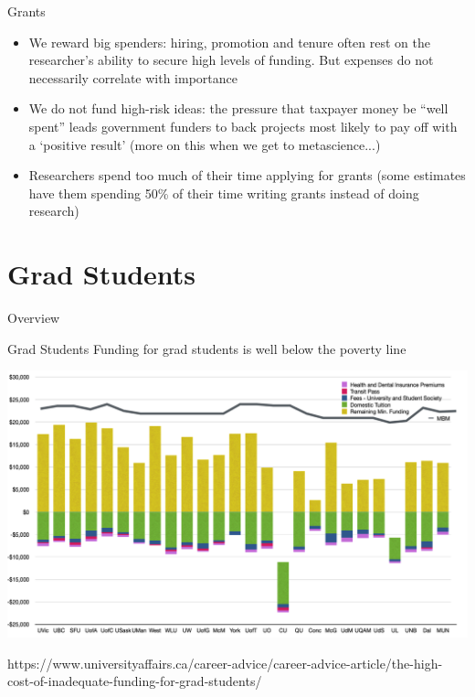 \documentclass{beamer}
\begin{document}
\begin{frame}{Grants}
	\begin{itemize}
		\item<1-> We reward big spenders: hiring, promotion and tenure often rest on the researcher's ability to secure high levels of funding. But expenses do not necessarily correlate with importance
		\item<2-> We do not fund high-risk ideas: the pressure that taxpayer money be ``well spent'' leads government funders to back projects most likely to pay off with a `positive result' (more on this when we get to metascience...)
		\item<3-> Researchers spend too much of their time applying for grants (some estimates have them spending 50\% of their time writing grants instead of doing research)
	\end{itemize}

\end{frame}


\section{Grad Students}
\begin{frame}{Overview}
\end{frame}
\begin{frame}{Grad Students}
	Funding for grad students is well below the poverty line
	
	\includegraphics[width=1\textwidth]{../images/gradfundpovertyline.png}
	
	\tiny{https://www.universityaffairs.ca/career-advice/career-advice-article/the-high-cost-of-inadequate-funding-for-grad-students/}

\end{frame}
\end{document}
